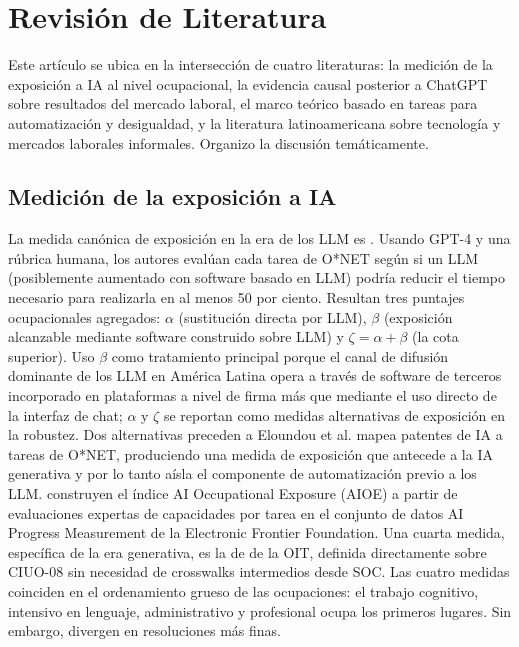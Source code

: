 \section{Revisi\'{o}n de Literatura}
\label{sec:literature}

Este art\'{i}culo se ubica en la intersecci\'{o}n de cuatro literaturas: la medici\'{o}n de la exposici\'{o}n a IA al nivel ocupacional, la evidencia causal posterior a ChatGPT sobre resultados del mercado laboral, el marco te\'{o}rico basado en tareas para automatizaci\'{o}n y desigualdad, y la literatura latinoamericana sobre tecnolog\'{i}a y mercados laborales informales. Organizo la discusi\'{o}n tem\'{a}ticamente.

\subsection{Medici\'{o}n de la exposici\'{o}n a IA}
\label{subsec:lit_exposure}

La medida can\'{o}nica de exposici\'{o}n en la era de los LLM es \citet{Eloundou2023_gpt_exposure}. Usando GPT-4 y una r\'{u}brica humana, los autores eval\'{u}an cada tarea de O*NET seg\'{u}n si un LLM (posiblemente aumentado con software basado en LLM) podr\'{i}a reducir el tiempo necesario para realizarla en al menos 50 por ciento. Resultan tres puntajes ocupacionales agregados: $\alpha$ (sustituci\'{o}n directa por LLM), $\beta$ (exposici\'{o}n alcanzable mediante software construido sobre LLM) y $\zeta = \alpha + \beta$ (la cota superior). Uso $\beta$ como tratamiento principal porque el canal de difusi\'{o}n dominante de los LLM en Am\'{e}rica Latina opera a trav\'{e}s de software de terceros incorporado en plataformas a nivel de firma m\'{a}s que mediante el uso directo de la interfaz de chat; $\alpha$ y $\zeta$ se reportan como medidas alternativas de exposici\'{o}n en la robustez. Dos alternativas preceden a Eloundou et al. \citet{Webb2020_ai_exposure} mapea patentes de IA a tareas de O*NET, produciendo una medida de exposici\'{o}n que antecede a la IA generativa y por lo tanto a\'{i}sla el componente de automatizaci\'{o}n previo a los LLM. \citet{Felten2023_ai_exposure} construyen el \'{i}ndice AI Occupational Exposure (AIOE) a partir de evaluaciones expertas de capacidades por tarea en el conjunto de datos AI Progress Measurement de la Electronic Frontier Foundation. Una cuarta medida, espec\'{i}fica de la era generativa, es la de \citet{GmyrekBB2023_genai_jobs} de la OIT, definida directamente sobre CIUO-08 sin necesidad de crosswalks intermedios desde SOC. Las cuatro medidas coinciden en el ordenamiento grueso de las ocupaciones: el trabajo cognitivo, intensivo en lenguaje, administrativo y profesional ocupa los primeros lugares. Sin embargo, divergen en resoluciones m\'{a}s finas.

